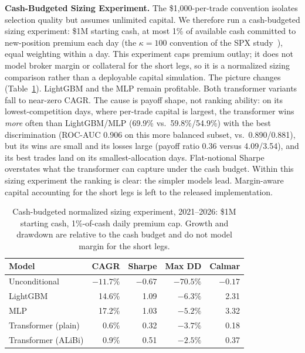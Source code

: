 \documentclass[sigconf,review]{acmart}
\begin{document}
\medskip\noindent\textbf{Cash-Budgeted Sizing Experiment.}
\label{sec:capitalscaled}
The \$1{,}000-per-trade convention isolates selection quality but assumes unlimited capital. We therefore run a cash-budgeted sizing experiment: \$1M starting cash, at most 1\% of available cash committed to new-position premium each day (the $\kappa=100$ convention of the SPX study~\cite{glasserman2025tp2}), equal weighting within a day. This experiment caps premium outlay; it does not model broker margin or collateral for the short legs, so it is a normalized sizing comparison rather than a deployable capital simulation. The picture changes (Table~\ref{tab:capitalscaled}). LightGBM and the MLP remain profitable. Both transformer variants fall to near-zero CAGR. The cause is payoff shape, not ranking ability: on its lowest-competition days, where per-trade capital is largest, the transformer wins \emph{more} often than LightGBM/MLP (69.9\% vs.\ 59.8\%/54.9\%) with the best discrimination (ROC-AUC 0.906 on this more balanced subset, vs.\ 0.890/0.881), but its wins are small and its losses large (payoff ratio 0.36 versus 4.09/3.54), and its best trades land on its smallest-allocation days. Flat-notional Sharpe overstates what the transformer can capture under the cash budget. Within this sizing experiment the ranking is clear: the simpler models lead. Margin-aware capital accounting for the short legs is left to the released implementation.

\begin{table}[t]
\centering
\footnotesize
\begin{tabular}{lrrrr}
\toprule
Model & CAGR & Sharpe & Max DD & Calmar \\
\midrule
Unconditional & $-11.7\%$ & $-0.67$ & $-70.5\%$ & $-0.17$ \\
LightGBM & 14.6\% & 1.09 & $-6.3\%$ & 2.31 \\
MLP & 17.2\% & 1.03 & $-5.2\%$ & 3.32 \\
Transformer (plain) & 0.6\% & 0.32 & $-3.7\%$ & 0.18 \\
Transformer (ALiBi) & 0.9\% & 0.51 & $-2.5\%$ & 0.37 \\
\bottomrule
\end{tabular}
\caption{Cash-budgeted normalized sizing experiment, 2021--2026: \$1M starting cash, 1\%-of-cash daily premium cap. Growth and drawdown are relative to the cash budget and do not model margin for the short legs.}
\label{tab:capitalscaled}
\end{table}
\end{document}
